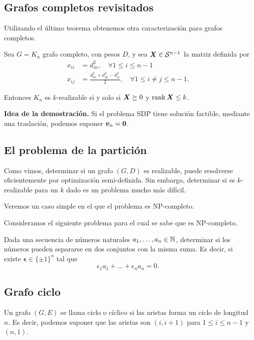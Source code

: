 \subsection{Grafos completos revisitados}

Utilizando el último teorema obtenemos otra caracterización para grafos completos.

\begin{theorem}
Sea $G = K_n$ grafo completo, con pesos $D$, y sea $\bm{X} \in {\mathcal S}^{n-1}$ la matriz definida por
\begin{align*}
x_{ii} &= d_{in}^2, \quad \forall 1 \le i \le n-1 \\
x_{ij} &= \frac{d_{in}^2 + d_{jn}^2 - d_{ij}^2}{2}, \quad \forall 1 \le i \neq j \le n-1.
\end{align*}

Entonces $K_n$ es $k$-realizable si y solo si $\bm{X} \succeq 0$ y $\operatorname{rank} \bm{X} \le k$.
\end{theorem}

\textbf{Idea de la demostración.} Si el problema SDP tiene solución factible, mediante una traslación, podemos suponer $\bm{v}_n = \bm{0}$.

\subsection{El problema de la partición}

Como vimos, determinar si un grafo $(G, D)$ es realizable, puede resolverse eficientemente por optimización semi-definida.
Sin embargo, determinar si es $k$-realizable para un $k$ dado es un problema mucho más difícil.

Veremos un caso simple en el que el problema es NP-completo.

Consideramos el siguiente problema para el cual se sabe que es NP-completo.

\begin{problem}
Dada una secuencia de números naturales $a_1, \dots, a_n \in \mathbb{N}$, determinar si los números pueden separarse en dos conjuntos con la misma suma. Es decir, si existe $\bm{\epsilon} \in \{\pm 1\}^n$ tal que
$$
\epsilon_1 a_1 + \dots + \epsilon_n a_n = 0.
$$
\end{problem}

\subsection{Grafo ciclo}

Un grafo $(G, E)$ se llama ciclo o cíclico si las aristas forma un ciclo de longitud $n$. Es decir, podemos suponer que las aristas son $(i, i+1)$ para $1 \le i \le n-1$ y $(n, 1)$.

